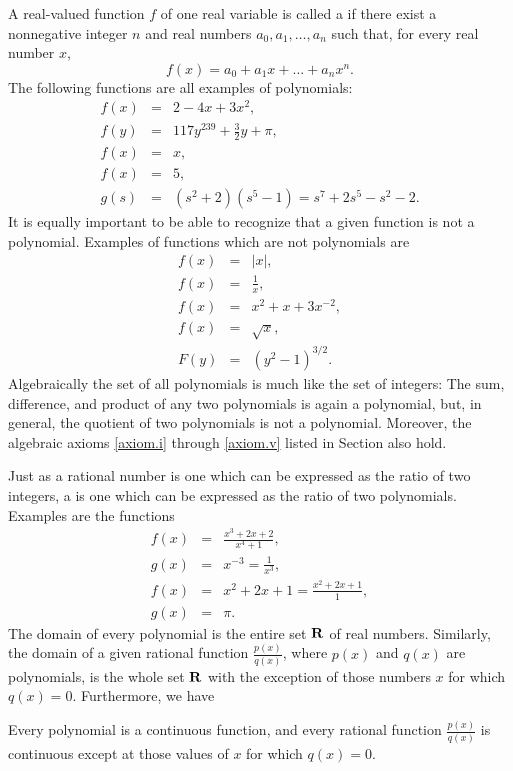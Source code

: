 A real-valued function $f$ of one real variable
is called a 
if there exist a nonnegative integer $n$ and real numbers
$a_{0}, a_{1}, \ldots, a_{n}$
such that, for every real number $x$,
\[
f(x) = a_{0} + a_{1}x + ... + a_{n}x^{n} .
\]
The following functions are all examples of polynomials:
\begin{eqnarray*}
f(x) &=& 2 - 4x + 3x^2,      \\
f(y) &=& 117y^{239} + {\frac{3}{2}}y + \pi,   \\
f(x) &=& x, \\
f(x) &=& 5, \\
g(s) &=& (s^2 + 2)(s^5 - 1) = s^7 + 2s^5 - s^2 - 2 . 
\end{eqnarray*}
It is equally important to be able to recognize that a given function is not a polynomial. Examples of functions which are not polynomials are
\begin{eqnarray*}
f(x) &=& |x|,               \\
f(x) &=& \frac{1}{x},       \\
f(x) &=& x^2 + x + 3x^{-2}, \\
f(x) &=& \sqrt{x},          \\
F(y) &=& (y^2 - 1)^{3/2} .
\end{eqnarray*}
Algebraically the set of all polynomials is much like the set of integers:
The sum, difference, and product of any two polynomials
is again a polynomial,
but, in general,
the quotient of two polynomials is not a polynomial.
Moreover, the algebraic axioms
\ref{axiom.i} through \ref{axiom.v}
listed in Section 
also hold.

Just as a rational number is one
which can be expressed as the ratio of two integers,
a 
is one which can be expressed as the ratio of two polynomials.
Examples are the functions 
\begin{eqnarray*}
f(x) &=& \frac{x^3 + 2x + 2}{x^4 + 1},           \\
g(x) &=& x^{-3} = \frac{1}{x^3},                 \\
f(x) &=& x^2 + 2x + 1 = \frac{x^2 + 2x + 1}{1},  \\
g(x) &=& \pi.
\end{eqnarray*}
The domain of every polynomial
is the entire set $\mathrm{\bf R}$ of real numbers.
Similarly, the domain of a given rational function
$\frac{p(x)}{q(x)}$,
where $p(x)$ and $q(x)$ are polynomials,
is the whole set $\mathrm{\bf R}$
with the exception of those numbers $x$
for which $q(x) = 0$.
Furthermore, we have
\begin{prop}\label{thm 1.4.3}
Every polynomial is a continuous function, and every rational function
$\frac{p(x)}{q(x)}$ is continuous except at those values of  $x$
for which  $q(x) = 0$.
\end{prop}

